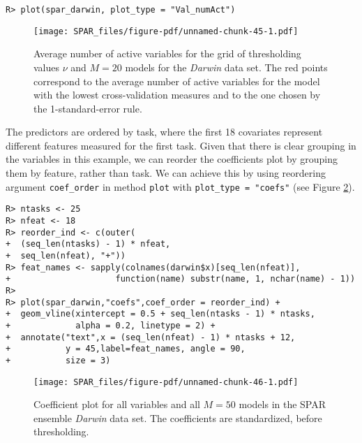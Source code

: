 \documentclass[
  article]{jss}
\begin{document}
\begin{verbatim}
R> plot(spar_darwin, plot_type = "Val_numAct")
\end{verbatim}

\begin{figure}[H]

{\centering \texttt{[image: SPAR\_files/figure-pdf/unnamed-chunk-45-1.pdf]}

}

\caption{Average number of active variables for the grid of thresholding
values \(\nu\) and \(M=20\) models for the \emph{Darwin} data set. The
red points correspond to the average number of active variables for the
model with the lowest cross-validation measures and to the one chosen by
the 1-standard-error rule. \label{fig:darwin_activevars}}

\end{figure}%

The predictors are ordered by task, where the first 18 covariates
represent different features measured for the first task. Given that
there is clear grouping in the variables in this example, we can reorder
the coefficients plot by grouping them by feature, rather than task. We
can achieve this by using reordering argument \texttt{coef\_order} in
method \texttt{plot} with \texttt{plot\_type\ =\ "coefs"} (see Figure
\ref{fig:darwin_coefs}).

\begin{verbatim}
R> ntasks <- 25
R> nfeat <- 18
R> reorder_ind <- c(outer(
+  (seq_len(ntasks) - 1) * nfeat,
+  seq_len(nfeat), "+"))
R> feat_names <- sapply(colnames(darwin$x)[seq_len(nfeat)],
+                     function(name) substr(name, 1, nchar(name) - 1))
R> 
R> plot(spar_darwin,"coefs",coef_order = reorder_ind) + 
+  geom_vline(xintercept = 0.5 + seq_len(ntasks - 1) * ntasks, 
+             alpha = 0.2, linetype = 2) +
+  annotate("text",x = (seq_len(nfeat) - 1) * ntasks + 12,
+           y = 45,label=feat_names, angle = 90,
+           size = 3)
\end{verbatim}

\begin{figure}[H]

{\centering \texttt{[image: SPAR\_files/figure-pdf/unnamed-chunk-46-1.pdf]}

}

\caption{Coefficient plot for all variables and all \(M=50\) models in
the SPAR ensemble \emph{Darwin} data set. The coefficients are
standardized, before thresholding. \label{fig:darwin_coefs}}

\end{figure}%
\end{document}
